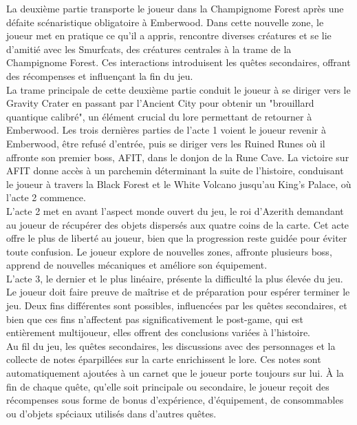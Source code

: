 La deuxième partie transporte le joueur dans la Champignome Forest après une défaite scénaristique obligatoire à Emberwood. 
Dans cette nouvelle zone, le joueur met en pratique ce qu'il a appris, rencontre diverses créatures et se lie d'amitié avec les Smurfcats, des créatures centrales à la trame de la Champignome Forest. 
Ces interactions introduisent les quêtes secondaires, offrant des récompenses et influençant la fin du jeu.
\\

La trame principale de cette deuxième partie conduit le joueur à se diriger vers le Gravity Crater en passant par l'Ancient City pour obtenir un "brouillard quantique calibré", un élément crucial du lore permettant de retourner à Emberwood. 
Les trois dernières parties de l'acte 1 voient le joueur revenir à Emberwood, être refusé d'entrée, puis se diriger vers les Ruined Runes où il affronte son premier boss, AFIT, dans le donjon de la Rune Cave. 
La victoire sur AFIT donne accès à un parchemin déterminant la suite de l'histoire, conduisant le joueur à travers la Black Forest et le White Volcano jusqu'au King's Palace, où l'acte 2 commence.
\\

L'acte 2 met en avant l'aspect monde ouvert du jeu, le roi d'Azerith demandant au joueur de récupérer des objets dispersés aux quatre coins de la carte. 
Cet acte offre le plus de liberté au joueur, bien que la progression reste guidée pour éviter toute confusion. 
Le joueur explore de nouvelles zones, affronte plusieurs boss, apprend de nouvelles mécaniques et améliore son équipement.
\\

L'acte 3, le dernier et le plus linéaire, présente la difficulté la plus élevée du jeu. 
Le joueur doit faire preuve de maîtrise et de préparation pour espérer terminer le jeu. 
Deux fins différentes sont possibles, influencées par les quêtes secondaires, et bien que ces fins n'affectent pas significativement le post-game, qui est entièrement multijoueur, elles offrent des conclusions variées à l'histoire.
\\

Au fil du jeu, les quêtes secondaires, les discussions avec des personnages et la collecte de notes éparpillées sur la carte enrichissent le lore. 
Ces notes sont automatiquement ajoutées à un carnet que le joueur porte toujours sur lui. 
À la fin de chaque quête, qu'elle soit principale ou secondaire, le joueur reçoit des récompenses sous forme de bonus d'expérience, d'équipement, de consommables ou d'objets spéciaux utilisés dans d'autres quêtes.
\\


